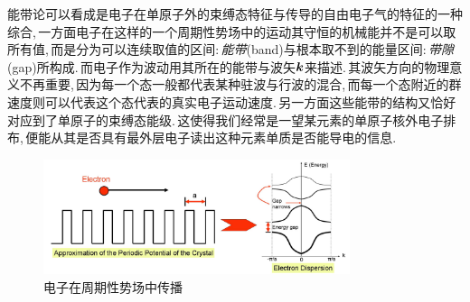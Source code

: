 能带论可以看成是电子在单原子外的束缚态特征与传导的自由电子气的特征的一种综合,\,一方面电子在这样的一个周期性势场中的运动其守恒的机械能并不是可以取所有值,\,而是分为可以连续取值的区间:\,\emph{能带}(band)与根本取不到的能量区间:\,\emph{带隙}(gap)所构成.\,而电子作为波动用其所在的能带与波矢$\boldsymbol{k}$来描述.\,其波矢方向的物理意义不再重要,\,因为每一个态一般都代表某种驻波与行波的混合,\,而每一个态附近的群速度则可以代表这个态代表的真实电子运动速度.\,另一方面这些能带的结构又恰好对应到了单原子的束缚态能级.\,这使得我们经常是一望某元素的单原子核外电子排布,\,便能从其是否具有最外层电子读出这种元素单质是否能导电的信息.
\begin{figure}[H]
\centering
\includegraphics[width=0.8\textwidth]{image/7-3-2.jpg}
\caption{电子在周期性势场中传播}
\end{figure}

